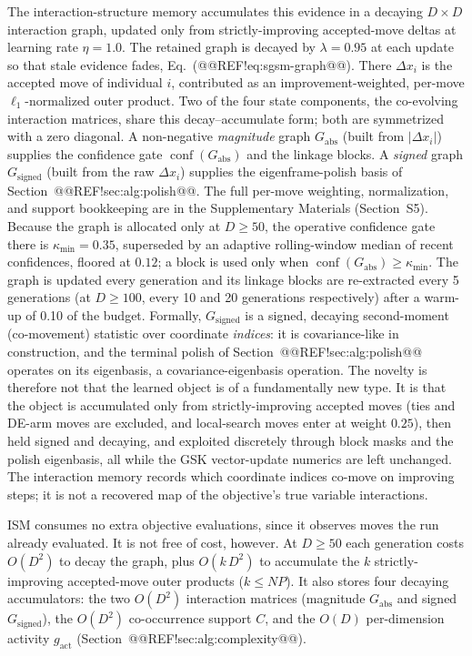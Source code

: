 \documentclass[10pt,a4paper]{article}
\begin{document}
The interaction-structure memory accumulates
this evidence in a decaying $D\times D$ interaction graph, updated
only from strictly-improving accepted-move deltas at learning rate $\eta=1.0$.
The retained graph is decayed by $\lambda=0.95$ at each update so that stale
evidence fades, Eq.~(@@REF!eq:sgsm-graph@@). There $\Delta x_i$ is the
accepted move of individual $i$, contributed as an improvement-weighted,
per-move $\ell_1$-normalized outer product. Two of the four state components, the co-evolving interaction
matrices, share this decay--accumulate form; both are symmetrized with a zero
diagonal. A non-negative \emph{magnitude} graph $G_{\mathrm{abs}}$ (built from
$|\Delta x_i|$) supplies the confidence gate $\operatorname{conf}(G_{\mathrm{abs}})$
and the linkage blocks. A \emph{signed} graph $G_{\mathrm{signed}}$
(built from the raw $\Delta x_i$) supplies the eigenframe-polish basis of
Section~@@REF!sec:alg:polish@@. The
full per-move weighting, normalization, and support bookkeeping are in the
Supplementary Materials (Section~S5). Because the graph is allocated only at
$D\ge50$, the operative confidence gate there is $\kappa_{\min}=0.35$,
superseded by an adaptive rolling-window median of recent confidences,
floored at $0.12$; a block is used only when
$\operatorname{conf}(G_{\mathrm{abs}})\ge\kappa_{\min}$. 
The graph is updated every generation and its linkage blocks are
re-extracted every 5 generations (at $D\ge100$, every 10 and 20
generations respectively) after a warm-up of 0.10 of the
budget. 
Formally, $G_{\mathrm{signed}}$ is a signed, decaying second-moment (co-movement)
statistic over coordinate \emph{indices}: it is covariance-like in
construction, and the terminal polish of
Section~@@REF!sec:alg:polish@@ operates on its eigenbasis, a
covariance-eigenbasis operation. The novelty is therefore not that the
learned object is of a fundamentally new type. It is that the object is
accumulated only from strictly-improving accepted moves (ties and DE-arm
moves are excluded, and local-search moves enter at weight $0.25$), then held
signed and decaying, and exploited discretely through block masks and the polish
eigenbasis, all while the GSK vector-update numerics are left unchanged. The
interaction memory records which coordinate indices co-move on improving steps;
it is not a recovered map of the objective's true variable interactions.

ISM consumes no extra objective evaluations, since it observes moves the
run already evaluated. It is not free of cost, however. At $D \geq 50$ each
generation costs $O(D^{2})$ to decay the graph, plus $O(k\,D^{2})$ to
accumulate the $k$ strictly-improving accepted-move outer products ($k \leq NP$).
It also stores four decaying accumulators: the two $O(D^{2})$ interaction
matrices (magnitude $G_{\mathrm{abs}}$ and signed $G_{\mathrm{signed}}$), the
$O(D^{2})$ co-occurrence support $C$, and the $O(D)$ per-dimension activity
$g_{\mathrm{act}}$
(Section~@@REF!sec:alg:complexity@@). 
\end{document}
